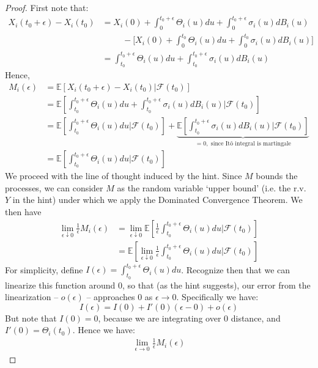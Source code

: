 \documentclass{article}
\newcommand{\E}{\mathbb{E}}
\newcommand{\F}{\mathcal{F}}
\newcommand{\eps}{\epsilon}
\newcommand{\limit}[1]{\underset{#1}{\lim}}
\theoremstyle{definition}
\theoremstyle{definition}
\begin{document}
\begin{enumerate}
\begin{enumerate}[(i)]
       \begin{proof}
First note that:
\begin{align*}
    X_i(t_0+\eps)-X_i(t_0) &= X_i(0) + \int_0^{t_0+\eps} \Theta_i(u) du + \int_0^{t_0+\eps} \sigma_i(u) dB_i(u) \\
    & \hspace{1cm} - \bigg[ X_i(0) + \int_0^{t_0} \Theta_i(u) du + \int_0^{t_0} \sigma_i(u) dB_i(u) \bigg] \\
    &= \int_{t_0}^{t_0+\eps} \Theta_i(u) du + \int_{t_0}^{t_0+\eps} \sigma_i(u)dB_i(u)
\end{align*}
Hence,
\begin{align*}
    M_i(\eps) &= \E[X_i(t_0+\eps)-X_i(t_0)|\F(t_0)] \\
              &= \E\left[ \int_{t_0}^{t_0+\eps} \Theta_i(u) du + \int_{t_0}^{t_0+\eps} \sigma_i(u)dB_i(u) \bigg| \F(t_0) \right] \\
              &= \E\left[ \int_{t_0}^{t_0+\eps}  \Theta_i(u) du\bigg| \F(t_0)  \right]+ \underset{=0, \text{ since It\^{o} integral is martingale}}{\underbrace{\E\left[ \int_{t_0}^{t_0+\eps} \sigma_i(u)dB_i(u) \bigg| \F(t_0) \right]}} \\
              &= \E\left[ \int_{t_0}^{t_0+\eps}  \Theta_i(u) du\bigg| \F(t_0)  \right]
\end{align*}
We proceed with the line of thought induced by the hint. Since $M$ bounds the processes, we can consider $M$ as the random variable `upper bound' (i.e. the r.v. $Y$ in the hint) under which we apply the Dominated Convergence Theorem. We then have 
    \begin{align*}
        \limit{\eps \downarrow 0} \frac{1}{\eps} M_i(\eps) &= 
        \limit{\eps \downarrow 0} \E\left[\frac{1}{\eps} \int_{t_0}^{t_0+\eps} \Theta_i(u) du \bigg|\F(t_0) \right] \\
        &=   \E\left[\limit{\eps \downarrow 0} \frac{1}{\eps} \int_{t_0}^{t_0+\eps} \Theta_i(u) du \bigg|\F(t_0) \right] 
    \end{align*}
       For simplicity, define $I(\eps) = \int_{t_0}^{t_0+\eps} \Theta_i(u) du$. Recognize then that we can linearize this function around $0$, so that (as the hint suggests), our error from the linearization -- $o(\eps)$ -- approaches $0$ as $\eps \to 0$. Specifically we have:
       $$ I(\eps) = I(0) + I'(0)(\eps-0) + o(\eps)$$
       But note that $I(0) =0$, because we are integrating over $0$ distance, and $I'(0)= \Theta_i(t_0)$. Hence we have:
       \begin{align*}
        \limit{\eps \to 0} \frac{1}{\eps} M_i(\eps) 

\end{align*}
\end{proof}
\end{enumerate}
\end{enumerate}
\end{document}
